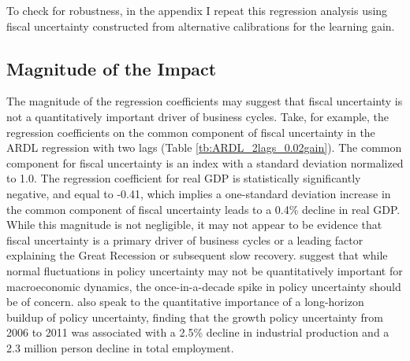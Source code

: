 \documentclass[11pt]{article}
\newcommand{\citee}[1]{\citet{#1}}
\begin{document}
To check for robustness, in the appendix I repeat this regression analysis using fiscal uncertainty constructed from alternative calibrations for the learning gain.  

\subsection{Magnitude of the Impact}\label{s:impact}

The magnitude of the regression coefficients may suggest that fiscal uncertainty is not a quantitatively important driver of business cycles.  Take, for example, the regression coefficients on the common component of fiscal uncertainty in the ARDL regression with two lags (Table \ref{tb:ARDL_2lags_0.02gain}).  The common component for fiscal uncertainty is an index with a standard deviation normalized to 1.0.  The regression coefficient for real GDP is statistically significantly negative, and equal to -0.41, which implies a one-standard deviation increase in the common component of fiscal uncertainty leads to a 0.4\% decline in real GDP.  While this magnitude is not negligible, it may not appear to be evidence that fiscal uncertainty is a primary driver of business cycles or a leading factor explaining the Great Recession or subsequent slow recovery.  \citee{fvetal2011} suggest that while normal fluctuations in policy uncertainty may not be quantitatively important for macroeconomic dynamics, the once-in-a-decade spike in policy uncertainty should be of concern.  \citee{baker2013} also speak to the quantitative importance of a long-horizon buildup of policy uncertainty, finding that the growth policy uncertainty from 2006 to 2011 was associated with a 2.5\% decline in industrial production and a 2.3 million person decline in total employment.
\end{document}
